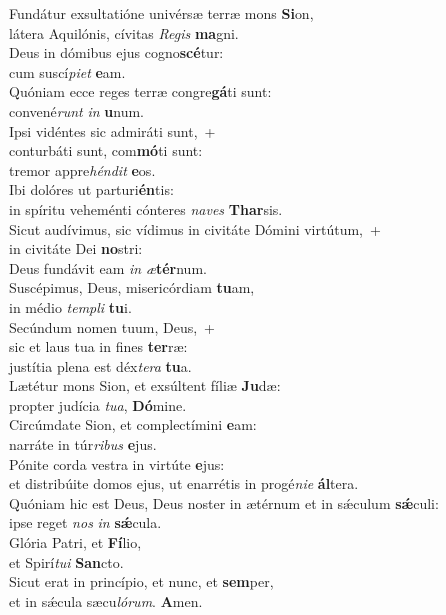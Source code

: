 \evenverse Fundátur exsultatióne univérsæ terræ mons \textbf{Si}on,~\*\\
\evenverse látera Aquilónis, cívitas \textit{Re}\textit{gis} \textbf{ma}gni.\\
\oddverse Deus in dómibus ejus cogno\textbf{scé}tur:~\*\\
\oddverse cum suscí\textit{pi}\textit{et} \textbf{e}am.\\
\evenverse Quóniam ecce reges terræ congre\textbf{gá}ti sunt:~\*\\
\evenverse convené\textit{runt} \textit{in} \textbf{u}num.\\
\oddverse Ipsi vidéntes sic admiráti sunt,~+\\
\oddverse  conturbáti sunt, com\textbf{mó}ti sunt:~\*\\
\oddverse tremor appre\textit{hén}\textit{dit} \textbf{e}os.\\
\evenverse Ibi dolóres ut parturi\textbf{én}tis:~\*\\
\evenverse in spíritu veheménti cónteres \textit{na}\textit{ves} \textbf{Thar}sis.\\
\oddverse Sicut audívimus, sic vídimus in civitáte Dómini virtútum,~+\\
\oddverse  in civitáte Dei \textbf{no}stri:~\*\\
\oddverse Deus fundávit eam \textit{in} \textit{æ}\textbf{tér}num.\\
\evenverse Suscépimus, Deus, misericórdiam \textbf{tu}am,~\*\\
\evenverse in médio \textit{tem}\textit{pli} \textbf{tu}i.\\
\oddverse Secúndum nomen tuum, Deus,~+\\
\oddverse  sic et laus tua in fines \textbf{ter}ræ:~\*\\
\oddverse justítia plena est déx\textit{te}\textit{ra} \textbf{tu}a.\\
\evenverse Lætétur mons Sion, et exsúltent fíliæ \textbf{Ju}dæ:~\*\\
\evenverse propter judícia \textit{tu}\textit{a}, \textbf{Dó}mine.\\
\oddverse Circúmdate Sion, et complectímini \textbf{e}am:~\*\\
\oddverse narráte in túr\textit{ri}\textit{bus} \textbf{e}jus.\\
\evenverse Pónite corda vestra in virtúte \textbf{e}jus:~\*\\
\evenverse et distribúite domos ejus, ut enarrétis in progé\textit{ni}\textit{e} \textbf{ál}tera.\\
\oddverse Quóniam hic est Deus, Deus noster in ætérnum et in sǽculum \textbf{sǽ}culi:~\*\\
\oddverse ipse reget \textit{nos} \textit{in} \textbf{sǽ}cula.\\
\evenverse Glória Patri, et \textbf{Fí}lio,~\*\\
\evenverse et Spirí\textit{tu}\textit{i} \textbf{San}cto.\\
\oddverse Sicut erat in princípio, et nunc, et \textbf{sem}per,~\*\\
\oddverse et in sǽcula sæcu\textit{ló}\textit{rum}. \textbf{A}men.\\
